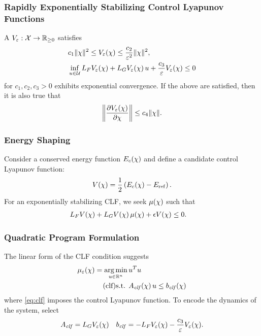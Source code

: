 \begin{frame}
  \frametitle{Rapidly Exponentially Stabilizing Control Lyapunov Functions}
  A 
  $V_{\varepsilon} : \mathcal{X} \to \mathbb{R}_{\geq 0}$ satisfies
  \begin{align*}
    &c_{1} \|\chi\|^{2} \leq V_{\varepsilon}(\chi) \leq \frac{c_{2}}{\varepsilon^{2}} \|\chi\|^{2},\\
    &\inf_{u \in \mathcal{U}} L_{F}V_{\varepsilon}(\chi) + L_{G}V_{\varepsilon}(\chi) \, u +
    \frac{c_{3}}{\varepsilon} V_{\varepsilon}(\chi) \leq 0
  \end{align*}
  for $c_{1}, c_{2}, c_{3} > 0$ exhibits exponential convergence. If the above
  are satisfied, then it is also true that
  \begin{align*}
    \left\| \frac{\partial{V_{\varepsilon}(\chi)}}{\partial{\chi}} \right\| \leq c_{4} \|\chi\|.
  \end{align*}
\end{frame}

\begin{frame}
  \frametitle{Energy Shaping}
  Consider a conserved energy function $E_{c}(\chi)$ and define a candidate
  control Lyapunov function:
  \begin{align*}
    V(\chi) = \frac{1}{2} \left(E_{c}(\chi) - E_{\mathrm{ref}}\right).
  \end{align*}
  For an exponentially stabilizing CLF, we seek $\mu(\chi)$ such that
  \begin{align*}
    L_{F} V(\chi) + L_{G} V(\chi) \, \mu(\chi) + \epsilon V(\chi) &\leq 0.
  \end{align*}
\end{frame}

\begin{frame}[t]
  \frametitle{Quadratic Program Formulation}
  The linear form of the CLF condition suggests
  \begin{align}
    \nonumber
    \mueps\arx = \argmin_{\uu \in \R^{n}}  \, & \uu^T \uu\\
    \label{eq:clf} \tag{clf}
    \mbox{s.t. } & \Aclf\arx \, \uu \leq \bclf\arx%
  \end{align}
  where \eqref{eq:clf} imposes the control Lyapunov function. To encode the dynamics of the system, select
  \begin{align*}
    A_{\mathit{clf}} = L_{G}V_{\varepsilon}(\chi)
    \quad
    b_{\mathit{clf}} = -L_{F}V_{\varepsilon}(\chi) - \frac{c_{3}}{\varepsilon} V_{\varepsilon}(\chi).
  \end{align*}
\end{frame}


